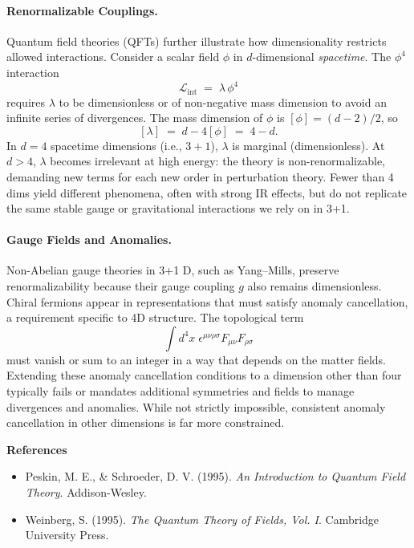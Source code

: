 \begin{technical}
    \paragraph{Renormalizable Couplings.}
    Quantum field theories (QFTs) further illustrate how dimensionality restricts allowed interactions. Consider a scalar field $\phi$ in $d$-dimensional \emph{spacetime}. The $\phi^4$ interaction 
    $$
    \mathcal{L}_{\mathrm{int}} \;=\; \lambda\,\phi^4
    $$
    requires $\lambda$ to be dimensionless or of non-negative mass dimension to avoid an infinite series of divergences. The mass dimension of $\phi$ is $[\phi] = (d - 2)/2$, so
    $$
    [\lambda] \;=\; d - 4[\phi] \;=\; 4 - d.
    $$
    In $d=4$ spacetime dimensions (i.e., $3+1$), $\lambda$ is marginal (dimensionless). At $d>4$, $\lambda$ becomes irrelevant at high energy: the theory is non-renormalizable, demanding new terms for each new order in perturbation theory. Fewer than 4 dims yield different phenomena, often with strong IR effects, but do not replicate the same stable gauge or gravitational interactions we rely on in 3+1.
    
    \paragraph{Gauge Fields and Anomalies.}
    Non-Abelian gauge theories in 3+1 D, such as Yang–Mills, preserve renormalizability because their gauge coupling $g$ also remains dimensionless. Chiral fermions appear in representations that must satisfy anomaly cancellation, a requirement specific to 4D structure. The topological term
    $$
    \int d^4 x \;\epsilon^{\mu\nu\rho\sigma} F_{\mu\nu} F_{\rho\sigma}
    $$
    must vanish or sum to an integer in a way that depends on the matter fields. Extending these anomaly cancellation conditions to a dimension other than four typically fails or mandates additional symmetries and fields to manage divergences and anomalies. While not strictly impossible, consistent anomaly cancellation in other dimensions is far more constrained.
    
    \vspace{0.5em}
    \noindent
    \textbf{References}
    \begin{itemize}
    \setlength\itemsep{0.25em}
    \item Peskin, M. E., \& Schroeder, D. V. (1995). \emph{An Introduction to Quantum Field Theory}. Addison-Wesley.
    \item Weinberg, S. (1995). \emph{The Quantum Theory of Fields, Vol. I}. Cambridge University Press.
    \end{itemize}
    
\end{technical}
    